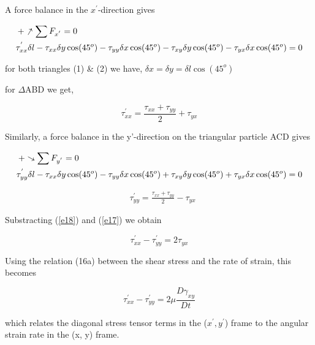 \documentclass{article}
\begin{document}
{A force balance in the $x^{'}$-direction gives

\begin{align*}
 & +\rotatebox[origin=c]{-30}{$\uparrow$}\sum F_{x^{'}} = 0 \\
 & \tau^{'}_{xx}\delta l - \tau_{xx}\delta {y}\cos(45^{o}) - \tau_{yy}\delta {x}\cos(45^{o}) - \tau_{xy}\delta y\cos(45^{o}) - \tau_{yx}\delta x\cos(45^{o})=0
\end{align*}

for both triangles (1) \& (2) we have, $\delta x = \delta y = \delta l\cos(45^{o})$

for $\Delta$ABD we get, 

\begin{equation} \label{e17}
\tau_{xx}^{'} = \frac{\tau_{xx}+\tau_{yy}}{2} + \tau_{yx}
\end{equation}

Similarly, a force balance in the y'-direction on the triangular particle ACD gives

\begin{align*}
& +\rotatebox[origin=c]{-120}{$\uparrow$}\sum F_{y^{'}} = 0\\
& \tau^{'}_{yy}\delta l - \tau_{xx}\delta {y}\cos(45^{o}) - \tau_{yy}\delta {x}\cos(45^{o}) + \tau_{xy}\delta y\cos(45^{o}) + \tau_{yx}\delta x\cos(45^{o})=0
\end{align*}
 
\begin{equation} \label{e18}
\begin{split}
& \tau_{yy}^{'} = \frac{\tau_{xx}+\tau_{yy}}{2} - \tau_{yx}
\end{split}
\end{equation}

Substracting (\ref{e18}) and (\ref{e17}) we obtain

\begin{equation} \label{e19}
\tau^{'}_{xx} - \tau^{'}_{yy} = 2\tau_{yx}
\end{equation}

Using the relation (16a) between the shear stress and the rate of strain, this becomes

\begin{equation}\label{e20}
\tau^{'}_{xx} - \tau^{'}_{yy} = 2\mu \frac{D\gamma_{xy}}{Dt}
\end{equation}

which relates the diagonal stress tensor terms in the ($x^{'},y^{'}$) frame to the angular strain rate in the (x, y) frame.

}
\end{document}
